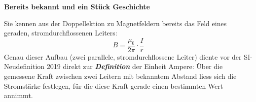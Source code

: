 \documentclass[addpoints,11pt,a4paper]{exam}
\newenvironment{beispielbox}[1][Beispiel]{%
  \par\addvspace{10pt}\noindent\textbf{#1}\par\smallskip\noindent
}{%
  \par\addvspace{10pt}
}
\begin{document}
\begin{beispielbox}[Bereits bekannt und ein Stück Geschichte]
Sie kennen aus der Doppellektion zu Magnetfeldern bereits das Feld eines
geraden, stromdurchflossenen Leiters:
\[
  B = \frac{\mu_0}{2\pi}\cdot\frac{I}{r}
\]
Genau dieser Aufbau (zwei parallele, stromdurchflossene Leiter) diente
vor der SI-Neudefinition 2019 direkt zur \textbf{\emph{Definition}} der
Einheit Ampere: Über die gemessene Kraft zwischen zwei Leitern mit
bekanntem Abstand liess sich die Stromstärke festlegen, für die diese Kraft
gerade einen bestimmten Wert annimmt.
\end{beispielbox}

\end{document}
